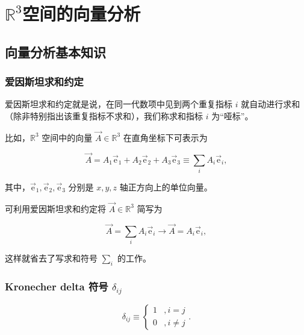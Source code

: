 \chapter{\texorpdfstring{$\mathbb{R}^3$空间的向量分析}{R3空间的向量分析}} %


\section{向量分析基本知识}

\subsection{爱因斯坦求和约定}

爱因斯坦求和约定就是说，在同一代数项中见到两个重复指标 $i$ 就自动进行求和（除非特别指出该重复指标不求和），我们称求和指标 $i$ 为“哑标”。

比如，$\mathbb{R}^3 $ 空间中的向量 $\vec{A}\in \mathbb{R}^3 $ 在直角坐标下可表示为

\begin{equation}
\vec{A}
=A_1\vec{\mathrm{e}}_1+A_2\vec{\mathrm{e}}_2+A_3\vec{\mathrm{e}}_3
\equiv \sum_{i} A_i \vec{\mathrm{e}}_i,
\end{equation}

其中，$\vec{\mathrm{e}}_1,\vec{\mathrm{e}}_2,\vec{\mathrm{e}}_3 $ 分别是 $x,y,z $ 轴正方向上的单位向量。

可利用爱因斯坦求和约定将 $\vec{A}\in \mathbb{R}^3 $ 简写为

\begin{equation}
\vec{A}
=\sum_{i} A_i \vec{\mathrm{e}}_i
\to
\vec{A}
=A_i \vec{\mathrm{e}}_i,
\end{equation}

这样就省去了写求和符号 $\displaystyle{\sum_i }$  的工作。 

\subsection{\texorpdfstring{Kronecher delta 符号 $\delta_{ij} $}{Kronecher delta 符号 }}

\begin{equation}
\delta_{ij}
\equiv\begin{cases}
1&,i=j \\
0&,i\ne j
\end{cases}.
\end{equation}

